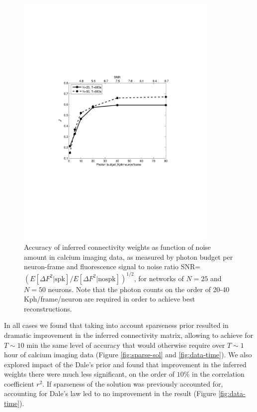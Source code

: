 \begin{figure}
\includegraphics[width=275pt]{../figs/Figure3_perf_vs_gamma}
\caption{Accuracy of inferred connectivity weights as function of noise amount in
calcium imaging data, as measured by photon budget per neuron-frame and fluorescence
signal to noise ratio
SNR=$\left({E[\Delta F^2 | \text{spk}]}/{E[\Delta F^2|\text{nospk}]}\right)^{1/2}$, 
for networks of $N=25$ and $N=50$ neurons. Note that the photon counts on the order of 20-40 Kph/frame/neuron are required in order to achieve best reconstructions.}
\label{fig:ca-noise}
\end{figure}

In all cases we found that taking into account sparseness prior resulted in dramatic improvement in the inferred connectivity matrix, allowing to achieve for $T\sim 10$ min the same level of accuracy that would otherwise require over $T\sim 1$ hour of calcium imaging data (Figure \ref{fig:sparse-sol} and \ref{fig:data-time}). We also explored impact of the Dale's prior and found that improvement in the inferred weights there were much less significant, on the order of $10\%$ in the correlation coefficient $r^2$. If sparseness of the solution was previously accounted for, accounting for Dale's law led to no improvement in the result (Figure \ref{fig:data-time}).

